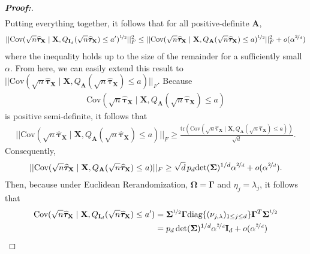 \documentclass[11pt,twoside]{article}
\theoremstyle{definition}
\theoremstyle{remark}
\begin{document}
\begin{proof}[\textbf{Proof:}]
\begin{align*}
\end{align*}
Putting everything together, it follows that for all positive-definite $\mathbf{A}$,
    \begin{align*}
        ||\text{Cov}(\sqrt{n} \widehat{\bm{\tau}}_{\mathbf{X}} \mid \mathbf{X}, Q_{\mathbf{I}_d}(\sqrt{n} \widehat{\bm{\tau}}_{\mathbf{X}}) \leq a^\prime)^{\nicefrac{1}{2}}||^2_{F} \leq ||\text{Cov}(\sqrt{n} \widehat{\bm{\tau}}_{\mathbf{X}} \mid \mathbf{X}, Q_{\mathbf{A}}(\sqrt{n} \widehat{\bm{\tau}}_{\mathbf{X}}) \leq a)^{\nicefrac{1}{2}}||^2_{F} + o(\alpha^{\nicefrac{2}{d}})
    \end{align*}
where the inequality holds up to the size of the remainder for a sufficiently small $\alpha$. From here, we can easily extend this result to $||\text{Cov}\left(\sqrt{n}\widehat{\bm{\tau}}_{\mathbf{X}} \mid \mathbf{X}, Q_{\mathbf{A}}(\sqrt{n} \widehat{\bm{\tau}}_{\mathbf{X}}) \leq a\right)||_F$. Because
\begin{align*}
    \text{Cov}\left(\sqrt{n}\widehat{\bm{\tau}}_{\mathbf{X}} \mid \mathbf{X}, Q_{\mathbf{A}}(\sqrt{n} \widehat{\bm{\tau}}_{\mathbf{X}}) \leq a\right)
\end{align*}
is positive semi-definite, it follows that
\begin{align*}
    ||\text{Cov}(\sqrt{n}\widehat{\bm{\tau}}_{\mathbf{X}} \mid \mathbf{X}, Q_{\mathbf{A}}(\sqrt{n} \widehat{\bm{\tau}}_{\mathbf{X}}) \leq a)||_F \geq \frac{
    \text{tr}(\text{Cov}\left(\sqrt{n}\widehat{\bm{\tau}}_{\mathbf{X}} \mid \mathbf{X}, Q_{\mathbf{A}}(\sqrt{n} \widehat{\bm{\tau}}_{\mathbf{X}}) \leq a\right)) }{\sqrt{d}}.
\end{align*}
Consequently,
\begin{align*}
    ||\text{Cov}(\sqrt{n}\widehat{\bm{\tau}}_{\mathbf{X}} \mid \mathbf{X}, Q_{\mathbf{A}}(\sqrt{n} \widehat{\bm{\tau}}_{\mathbf{X}}) \leq a)||_F \geq \sqrt{d} \,  p_d \text{det}(\mathbf{\Sigma})^{1/d} \alpha^{\nicefrac{2}{d}} + o(\alpha^{\nicefrac{2}{d}}).
\end{align*}
Then, because under Euclidean Rerandomization, $\mathbf{\Omega}=\mathbf{\Gamma}$ and $\eta_j=\lambda_j$, it follows that 
\begin{align*}
    \text{Cov}(\sqrt{n}\widehat{\bm{\tau}}_{\mathbf{X}} \mid \mathbf{X}, Q_{\mathbf{I}_d}(\sqrt{n} \widehat{\bm{\tau}}_{\mathbf{X}}) \leq a^\prime) &= \mathbf{\Sigma}^{\nicefrac{1}{2}} \mathbf{\Gamma}
    \text{diag}\{(\nu_{j,\lambda})_{1\leq j\leq d}\} \mathbf{\Gamma}^T \mathbf{\Sigma}^{\nicefrac{1}{2}} \\
    &= p_d \operatorname{det}(\mathbf{\Sigma})^{1/d} \alpha^{\nicefrac{2}{d}} \mathbf{I}_d + o(\alpha^{\nicefrac{2}{d}})

\end{align*}
\end{proof}
\end{document}
